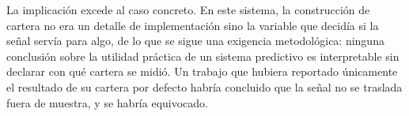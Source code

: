 La implicación excede al caso concreto. En este sistema, la construcción de cartera no era un
detalle de implementación sino la variable que decidía si la señal servía para algo, de lo que se
sigue una exigencia metodológica: ninguna conclusión sobre la utilidad práctica de un
sistema predictivo es interpretable sin declarar con qué cartera se midió. Un trabajo que hubiera
reportado únicamente el resultado de su cartera por defecto habría concluido que la señal no se
traslada fuera de muestra, y se habría equivocado.
